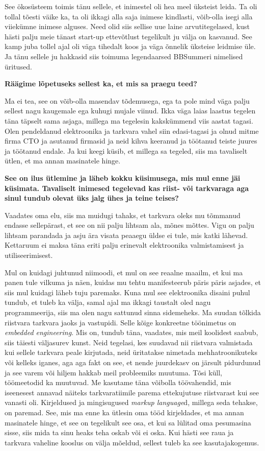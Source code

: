 See ökosüsteem toimis tänu sellele, et inimestel oli hea meel üksteist leida. 
Ta oli tollal tõesti väike ka, ta oli ikkagi alla saja inimese kindlasti,  
võib-olla isegi alla viiekümne inimese alguses. Need olid siis sellise uue 
laine  arvutitegelased, kust hästi palju meie tänast  start-up ettevõtlust 
tegelikult ju välja on kasvanud. See kamp juba tollel ajal oli väga tihedalt 
koos ja väga õnnelik üksteise leidmise üle. Ja tänu sellele ju hakkasid siis 
toimuma legendaarsed BBSummeri nimelised üritused. 

\textbf{Räägime lõpetuseks sellest ka, et mis sa praegu teed?}

Ma ei tea, see on võib-olla masendav tõdemusega, ega ta pole mind väga palju 
sellest nagu kaugemale ega kuhugi mujale viinud. Ikka väga laias laastus 
tegelen täna täpselt sama asjaga, millega ma tegelesin kakskümmend viis aastat 
tagasi. Olen pendeldanud elektroonika ja tarkvara vahel siin edasi-tagasi ja 
olnud mitme firma CTO ja  asutanud firmasid ja neid kihva keeranud ja töötanud 
teiste juures ja töötanud endale. Ja kui keegi küsib, et millega sa tegeled, 
siis ma tavaliselt ütlen, et ma annan masinatele hinge. 


\textbf{See on ilus ütlemine ja läheb kokku küsimusega, mis mul enne jäi 
küsimata. Tavaliselt inimesed tegelevad kas riist- või tarkvaraga aga sinul 
tundub olevat üks jalg ühes ja teine teises?}

Vaadates oma elu, siis ma muidugi tahaks, et tarkvara oleks mu tõmmanud endasse 
sellepärast, et see on nii palju  lihtsam ala, mõnes mõttes. Vigu on palju 
lihtsam parandada ja asju ära visata peaaegu üldse ei tule, mis katki lähevad. 
Kettaruum ei maksa täna eriti palju erinevalt elektroonika valmistamisest ja
utiliseerimisest.

Mul on kuidagi juhtunud niimoodi, et mul on see reaalne maailm, et kui ma panen 
tule vilkuma ja näen, kuidas mu tehtu  manifesteerub päris päris asjades, et 
siis mul kuidagi läheb tuju paremaks. Kuna mul see elektroonika disaini puhul 
tundub, et tuleb ka välja, samal ajal ma ikkagi taustalt oled nagu 
programmeerija, siis ma olen nagu sattunud sinna sidemeheks. Ma suudan tõlkida 
riistvara tarkvara jaoks ja vastupidi. Selle kõige konkreetne töönimetus on 
\emph{embedded engineering}. Mis on, tundub täna, vaadates, mis meil koolidest 
saabub, siis täiesti väljasurev kunst. Neid tegelasi, kes suudavad nii 
riistvara valmistada kui sellele tarkvara peale kirjutada, neid üritatakse 
nimetada mehhatroonikuteks või kelleks iganes, aga aga fakt on see, et nende 
juurdekasv on järsult pidurdunud ja see varem või hiljem hakkab meil 
probleemiks muutuma. Tõsi küll, töömeetodid ka muutuvad. Me kasutame täna
võibolla töövahendid, mis iseenesest annavad näiteks tarkvaratiimile parema 
ettekujutuse riistvarast kui see vanasti oli. Kirjeldused ja mingisugused 
\emph{markup language}d, millega  seda tehakse, on paremad. See, mis ma enne ka 
ütlesin oma tööd kirjeldades, et ma annan masinatele hinge, et see on 
tegelikult see osa, et kui sa lülitad oma pesumasina sisse, siis mida ta sinu 
heaks teha oskab või ei oska. Kui hästi see  raua ja tarkvara vaheline kooslus 
on välja mõeldud, sellest tuleb ka see kasutajakogemus. 

